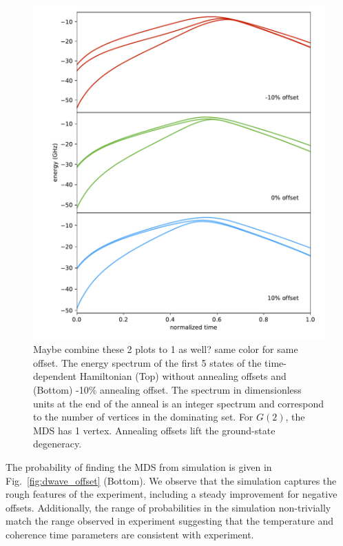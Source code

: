 \documentclass[prd,twocolumn,tightenlines,preprintnumbers,showpacs,superscriptaddress,notitlepage,nofootinbib,eqsecnum,floatfix,longbibliography]{revtex4}
\begin{document}
\begin{figure}
	\centering
	\includegraphics[width=\columnwidth]{./figures/spectrum_all.pdf}
	\caption{{\color{red} Maybe combine these 2 plots to 1 as well? same color for same offset.} The energy spectrum of the first 5 states of the time-dependent Hamiltonian (Top) without annealing offsets and (Bottom) -10\% annealing offset. The spectrum in dimensionless units at the end of the anneal is an integer spectrum and correspond to the number of vertices in the dominating set. For $G(2)$, the MDS has 1 vertex. Annealing offsets lift the ground-state degeneracy.}
	\label{fig:spectrum}
\end{figure}

The probability of finding the MDS from simulation is given in Fig.~\ref{fig:dwave_offset} (Bottom). We observe that the simulation captures the rough features of the experiment, including a steady improvement for negative offsets. Additionally, the range of probabilities in the simulation non-trivially match the range observed in experiment suggesting that the temperature and coherence time parameters are consistent with experiment.
\end{document}
